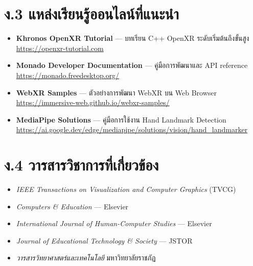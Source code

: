 \section*{ง.3 แหล่งเรียนรู้ออนไลน์ที่แนะนำ}

\begin{itemize}
    \item \textbf{Khronos OpenXR Tutorial} — บทเรียน C++ OpenXR ระดับเริ่มต้นถึงขั้นสูง \\
          \url{https://openxr-tutorial.com}
    \item \textbf{Monado Developer Documentation} — คู่มือการพัฒนาและ API reference \\
          \url{https://monado.freedesktop.org/}
    \item \textbf{WebXR Samples} — ตัวอย่างการพัฒนา WebXR บน Web Browser \\
          \url{https://immersive-web.github.io/webxr-samples/}
    \item \textbf{MediaPipe Solutions} — คู่มือการใช้งาน Hand Landmark Detection \\
          \url{https://ai.google.dev/edge/mediapipe/solutions/vision/hand\_landmarker}
\end{itemize}

\section*{ง.4 วารสารวิชาการที่เกี่ยวข้อง}

\begin{itemize}
    \item \textit{IEEE Transactions on Visualization and Computer Graphics} (TVCG)
    \item \textit{Computers \& Education} — Elsevier
    \item \textit{International Journal of Human-Computer Studies} — Elsevier
    \item \textit{Journal of Educational Technology \& Society} — JSTOR
    \item \textit{วารสารวิทยาศาสตร์และเทคโนโลยี} มหาวิทยาลัยราชภัฏ
\end{itemize}
